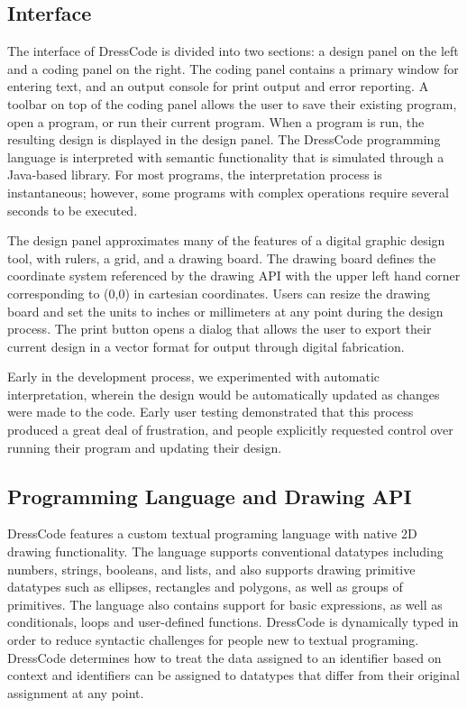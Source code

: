 \documentclass{sigchi}
\begin{document}
\subsection{Interface}
The interface of DressCode is divided into two sections: a design panel on the left and a coding panel on the right. The coding panel contains a primary window for entering text, and an output console for print output and error reporting. A toolbar on top of the coding panel allows the user to save their existing program, open a program, or run their current program. When a program is run, the resulting design is displayed in the design panel. The DressCode programming language is interpreted with semantic functionality that is simulated through a Java-based library. For most programs, the interpretation process is instantaneous; however, some programs with complex operations require several seconds to be executed.

The design panel approximates many of the features of a digital graphic design tool, with rulers, a grid, and a drawing board. The drawing board defines the coordinate system referenced by the drawing API with the upper left hand corner corresponding to (0,0) in cartesian coordinates. Users can resize the drawing board and set the units to inches or millimeters at any point during the design process. The print button opens a dialog that allows the user to export their current design in a vector format for output through digital fabrication. 

Early in the development process, we experimented with automatic interpretation, wherein the design would be automatically updated as changes were made to the code. Early user testing demonstrated that this process produced a great deal of frustration, and people explicitly requested control over running their program and updating their design.
 
\subsection{Programming Language and Drawing API}
DressCode features a custom textual programing language with native 2D drawing functionality. The language supports conventional datatypes including numbers, strings, booleans, and lists, and also supports drawing primitive datatypes such as ellipses, rectangles and polygons, as well as groups of primitives. The language also contains support for basic expressions, as well as conditionals, loops and user-defined functions. DressCode is dynamically typed in order to reduce syntactic challenges for people new to textual programing. DressCode determines how to treat the data assigned to an identifier based on context and identifiers can be assigned to datatypes that differ from their original assignment at any point. 
\end{document}
